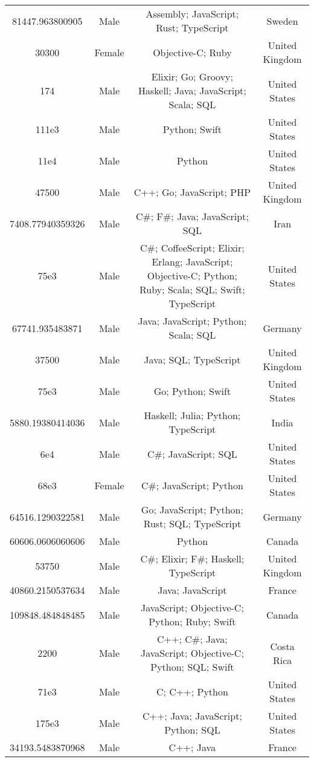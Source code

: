 \begin{center}
\begin{tabular}{ |c|c|c|c| }
81447.963800905  &  Male  &  Assembly; JavaScript; Rust; TypeScript  &  Sweden  \\ 
30300  &  Female  &  Objective-C; Ruby  &  United Kingdom  \\ 
174  &  Male  &  Elixir; Go; Groovy; Haskell; Java; JavaScript; Scala; SQL  &  United States  \\ 
111e3  &  Male  &  Python; Swift  &  United States  \\ 
11e4  &  Male  &  Python  &  United States  \\ 
47500  &  Male  &  C++; Go; JavaScript; PHP  &  United Kingdom  \\ 
7408.77940359326  &  Male  &  C\#; F\#; Java; JavaScript; SQL  &  Iran  \\ 
75e3  &  Male  &  C\#; CoffeeScript; Elixir; Erlang; JavaScript; Objective-C; Python; Ruby; Scala; SQL; Swift; TypeScript  &  United States  \\ 
67741.935483871  &  Male  &  Java; JavaScript; Python; Scala; SQL  &  Germany  \\ 
37500  &  Male  &  Java; SQL; TypeScript  &  United Kingdom  \\ 
75e3  &  Male  &  Go; Python; Swift  &  United States  \\ 
5880.19380414036  &  Male  &  Haskell; Julia; Python; TypeScript  &  India  \\ 
6e4  &  Male  &  C\#; JavaScript; SQL  &  United States  \\ 
68e3  &  Female  &  C\#; JavaScript; Python  &  United States  \\ 
64516.1290322581  &  Male  &  Go; JavaScript; Python; Rust; SQL; TypeScript  &  Germany  \\ 
60606.0606060606  &  Male  &  Python  &  Canada  \\ 
53750  &  Male  &  C\#; Elixir; F\#; Haskell; TypeScript  &  United Kingdom  \\ 
40860.2150537634  &  Male  &  Java; JavaScript  &  France  \\ 
109848.484848485  &  Male  &  JavaScript; Objective-C; Python; Ruby; Swift  &  Canada  \\ 
2200  &  Male  &  C++; C\#; Java; JavaScript; Objective-C; Python; SQL; Swift  &  Costa Rica  \\ 
71e3  &  Male  &  C; C++; Python  &  United States  \\ 
175e3  &  Male  &  C++; Java; JavaScript; Python; SQL  &  United States  \\ 
34193.5483870968  &  Male  &  C++; Java  &  France  \\ 

\end{tabular}
\end{center}
